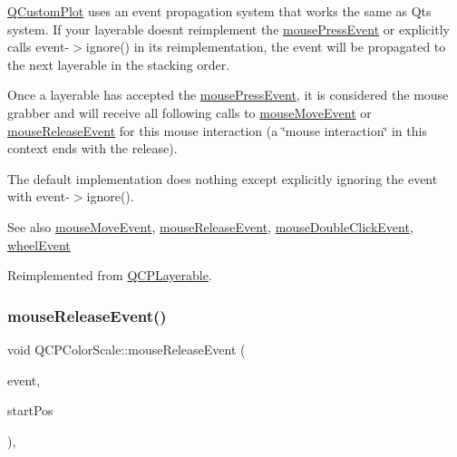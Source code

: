 \hyperlink{class_q_custom_plot}{Q\+Custom\+Plot} uses an event propagation system that works the same as Qt\textquotesingle{}s system. If your layerable doesn\textquotesingle{}t reimplement the \hyperlink{class_q_c_p_color_scale_a91f633b97ffcd57fdf8cd814974c20e6}{mouse\+Press\+Event} or explicitly calls {\ttfamily event-\/$>$ignore()} in its reimplementation, the event will be propagated to the next layerable in the stacking order.

Once a layerable has accepted the \hyperlink{class_q_c_p_color_scale_a91f633b97ffcd57fdf8cd814974c20e6}{mouse\+Press\+Event}, it is considered the mouse grabber and will receive all following calls to \hyperlink{class_q_c_p_color_scale_a3b2bd79725aefaf2630fc76e90939442}{mouse\+Move\+Event} or \hyperlink{class_q_c_p_color_scale_a6a35dd39ab4e5cb2d7b29ebb4d5b61b0}{mouse\+Release\+Event} for this mouse interaction (a \char`\"{}mouse interaction\char`\"{} in this context ends with the release).

The default implementation does nothing except explicitly ignoring the event with {\ttfamily event-\/$>$ignore()}.

\begin{DoxySeeAlso}{See also}
\hyperlink{class_q_c_p_color_scale_a3b2bd79725aefaf2630fc76e90939442}{mouse\+Move\+Event}, \hyperlink{class_q_c_p_color_scale_a6a35dd39ab4e5cb2d7b29ebb4d5b61b0}{mouse\+Release\+Event}, \hyperlink{class_q_c_p_layerable_a4171e2e823aca242dd0279f00ed2de81}{mouse\+Double\+Click\+Event}, \hyperlink{class_q_c_p_color_scale_a63cf19be184f6670c9495ad3a9a1baeb}{wheel\+Event} 
\end{DoxySeeAlso}


Reimplemented from \hyperlink{class_q_c_p_layerable_af6567604818db90f4fd52822f8bc8376}{Q\+C\+P\+Layerable}.

\mbox{\label{class_q_c_p_color_scale_a6a35dd39ab4e5cb2d7b29ebb4d5b61b0}} 
\subsubsection{\texorpdfstring{mouse\+Release\+Event()}{mouseReleaseEvent()}}
{\footnotesize\ttfamily void Q\+C\+P\+Color\+Scale\+::mouse\+Release\+Event (\begin{DoxyParamCaption}\item[{Q\+Mouse\+Event $\ast$}]{event,  }\item[{const Q\+PointF \&}]{start\+Pos }\end{DoxyParamCaption})\hspace{0.3cm}{\ttfamily [protected]}, {\ttfamily [virtual]}}


